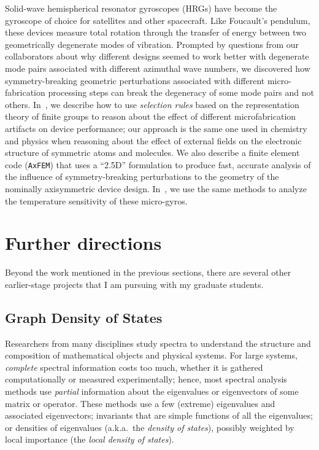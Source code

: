 \documentclass{amsart}
\begin{document}
Solid-wave hemispherical resonator gyroscopes (HRGs) have become the
gyroscope of choice for satellites and other spacecraft.  Like Foucault's
pendulum, these devices measure total rotation through the transfer
of energy between two geometrically degenerate modes of vibration.
Prompted by questions from our collaborators about why different designs
seemed to work better with degenerate mode pairs associated with
different azimuthal wave numbers, we discovered how symmetry-breaking
geometric perturbations associated with different micro-fabrication
processing steps can break the degeneracy of some mode pairs and
not others.
In~\cite{2013-sensors}, we describe how to use
{\em selection rules} based on the representation theory of
finite groups to reason about the effect of different microfabrication
artifacts on device performance; our approach is the
same one used in chemistry and physics when reasoning about the
effect of external fields on the electronic structure of
symmetric atoms and molecules.  We also describe a finite
element code ({\tt AxFEM}) that uses a ``2.5D'' formulation to
produce fast, accurate analysis of the influence of symmetry-breaking
perturbations to the geometry of the nominally axisymmetric
device design.  In~\cite{2016-sensors,2016-hh-workshop}, we use
the same methods to analyze the temperature sensitivity of these
micro-gyros.

\section{Further directions}
\label{sec-directions}

Beyond the work mentioned in the previous sections, there are
several other earlier-stage projects that I am pursuing with my
graduate students.

\subsection*{Graph Density of States}


Researchers from many disciplines study spectra to understand the
structure and composition of mathematical objects and physical systems.
For large systems, {\em complete} spectral information costs too much,
whether it is gathered computationally or measured experimentally;
hence, most spectral analysis methods use {\em partial} information
about the eigenvalues or eigenvectors of some matrix or operator.
These methods use a few (extreme) eigenvalues and
associated eigenvectors; invariants that are simple functions of all the
eigenvalues; or densities of eigenvalues (a.k.a.~the {\em density of states}),
possibly weighted by local importance (the {\em local density of states}).
\end{document}
